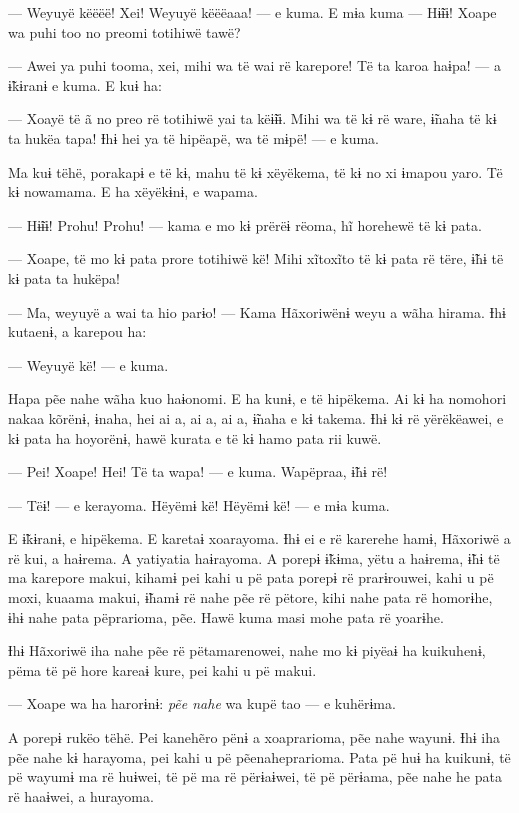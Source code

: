 — Weyuyë këëëë! Xei! Weyuyë këëëaaa! --- e kuma. E mɨa kuma --- Hɨ̃ɨɨ!
Xoape wa puhi too no preomi totihiwë tawë?

— Awei ya puhi tooma, xei, mihi wa të wai rë karepore! Të ta karoa haɨpa!
--- a ɨ̃kɨranɨ e kuma. E kuɨ ha: 

— Xoayë të ã no preo rë totihiwë yai ta këɨ̃ɨɨ. Mihi wa të kɨ rë ware,
ɨ̃naha të kɨ ta hukëa tapa! Ɨhɨ hei ya të hipëapë, wa të mɨpë! --- e
kuma. 

Ma kuɨ tëhë, porakapɨ e të kɨ, mahu të kɨ xëyëkema, të kɨ no xi ɨmapou
yaro. Të kɨ nowamama. E ha xëyëkɨnɨ, e wapama. 

— Hɨ̃ɨɨ! Prohu! Prohu! --- kama e mo kɨ prërëɨ rëoma, hĩ horehewë të kɨ
pata. 

— Xoape, të mo kɨ pata prore totihiwë kë! Mihi xĩtoxĩto të kɨ pata rë
tëre, ɨ̃hɨ të kɨ pata ta hukëpa!

— Ma, weyuyë a wai ta hio parɨo! --- Kama Hãxoriwënɨ weyu a wãha hirama.
Ɨhɨ kutaenɨ, a karepou ha:

— Weyuyë kë! --- e kuma. 

Hapa pẽe nahe wãha kuo haɨonomi. E ha kunɨ, e të hipëkema. Ai kɨ ha
nomohori nakaa kõrënɨ, ɨnaha, hei ai a, ai a, ai a, ɨ̃naha e kɨ takema.
Ɨhɨ kɨ rë yërëkëawei, e kɨ pata ha hoyorënɨ, hawë kurata e të kɨ hamo
pata rii kuwë. 

— Pei! Xoape! Hei! Të ta wapa! --- e kuma. Wapëpraa, ɨ̃hɨ rë! 

— Tëɨ! --- e kerayoma. Hëyëmɨ kë! Hëyëmɨ kë! --- e mɨa kuma. 

E ɨ̃kɨranɨ, e hipëkema. E karetaɨ xoarayoma. Ɨhɨ ei e rë karerehe hamɨ,
Hãxoriwë a rë kui, a haɨrema. A yatiyatia haɨrayoma. A porepɨ ɨ̃kɨma,
yëtu a haɨrema, ɨ̃hɨ të ma karepore makui, kihamɨ pei kahi u pë pata
porepɨ rë prarɨrouwei, kahi u pë moxi, kuaama makui, ɨ̃hamɨ rë nahe pẽe
rë pëtore, kihi nahe pata rë homorɨhe, ɨhɨ nahe pata pëprarioma, pẽe.
Hawë kuma masi mohe pata rë yoarɨhe. 

Ɨhɨ Hãxoriwë iha nahe pẽe rë pëtamarenowei, nahe mo kɨ piyëaɨ ha
kuikuhenɨ, pëma të pë hore kareaɨ kure, pei kahi u pë makui. 

— Xoape wa ha harorɨnɨ: \emph{pẽe nahe} wa kupë tao --- e kuhërɨma. 

A porepɨ rukëo tëhë. Pei kanehẽro pënɨ a xoaprarioma, pẽe nahe wayunɨ.
Ɨhɨ iha pẽe nahe kɨ harayoma, pei kahi u pë pẽenaheprarioma. Pata pë huɨ
ha kuikunɨ, të pë wayumɨ ma rë huɨwei, të pë ma rë përɨaɨwei, të pë
përɨama, pẽe nahe he pata rë haaɨwei, a hurayoma. 

